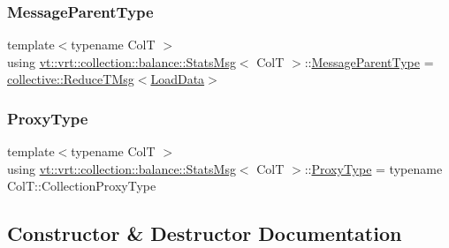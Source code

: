 \subsubsection{\texorpdfstring{Message\+Parent\+Type}{MessageParentType}}
{\footnotesize\ttfamily template$<$typename ColT $>$ \\
using \hyperlink{structvt_1_1vrt_1_1collection_1_1balance_1_1_stats_msg}{vt\+::vrt\+::collection\+::balance\+::\+Stats\+Msg}$<$ ColT $>$\+::\hyperlink{structvt_1_1collective_1_1reduce_1_1operators_1_1_reduce_t_msg_a0dd12197060e03bb7e73dbe299044f22}{Message\+Parent\+Type} =  \hyperlink{namespacevt_1_1collective_a28b82d5d48c9bc6e4fd738fcbf9e0f62}{collective\+::\+Reduce\+T\+Msg}$<$\hyperlink{structvt_1_1vrt_1_1collection_1_1balance_1_1_load_data}{Load\+Data}$>$}

\mbox{\label{structvt_1_1vrt_1_1collection_1_1balance_1_1_stats_msg_a6f88a58947e0a02b3f7dcfec8b91b5fd}} 
\subsubsection{\texorpdfstring{Proxy\+Type}{ProxyType}}
{\footnotesize\ttfamily template$<$typename ColT $>$ \\
using \hyperlink{structvt_1_1vrt_1_1collection_1_1balance_1_1_stats_msg}{vt\+::vrt\+::collection\+::balance\+::\+Stats\+Msg}$<$ ColT $>$\+::\hyperlink{structvt_1_1vrt_1_1collection_1_1balance_1_1_stats_msg_a6f88a58947e0a02b3f7dcfec8b91b5fd}{Proxy\+Type} =  typename Col\+T\+::\+Collection\+Proxy\+Type}



\subsection{Constructor \& Destructor Documentation}
\mbox{\label{structvt_1_1vrt_1_1collection_1_1balance_1_1_stats_msg_af801cc4ea278bc1d03ef87760cdb0ce4}} 
